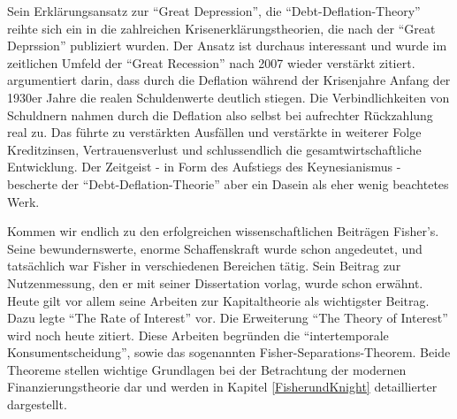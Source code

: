 Sein Erklärungsansatz zur "`Great Depression"', die "`Debt-Deflation-Theory"' \parencite{Fisher1933} reihte sich ein in die zahlreichen Krisenerklärungstheorien, die nach der "`Great Deprssion"' publiziert wurden. Der Ansatz ist durchaus interessant und wurde im zeitlichen Umfeld der "`Great Recession"' nach 2007 wieder verstärkt zitiert. \textcite{Fisher1933} argumentiert darin, dass durch die Deflation während der Krisenjahre Anfang der 1930er Jahre die realen  Schuldenwerte deutlich stiegen. Die Verbindlichkeiten von Schuldnern nahmen durch die Deflation also selbst bei aufrechter Rückzahlung real zu. Das führte zu verstärkten Ausfällen und verstärkte in weiterer Folge Kreditzinsen, Vertrauensverlust und schlussendlich die gesamtwirtschaftliche Entwicklung. Der Zeitgeist - in Form des Aufstiegs des Keynesianismus - bescherte der "`Debt-Deflation-Theorie"' aber ein Dasein als eher wenig beachtetes Werk.

Kommen wir endlich zu den erfolgreichen wissenschaftlichen Beiträgen Fisher's. Seine bewundernswerte, enorme Schaffenskraft wurde schon angedeutet, und tatsächlich war Fisher in verschiedenen Bereichen tätig. Sein Beitrag zur Nutzenmessung, den er mit seiner Dissertation \parencite{Fisher1892} vorlag, wurde schon erwähnt. Heute gilt vor allem seine Arbeiten zur Kapitaltheorie als wichtigster Beitrag. Dazu legte \textcite{Fisher1907} "`The Rate of Interest"' vor. Die Erweiterung \textcite{Fisher1930} "`The Theory of Interest"' wird noch heute zitiert. Diese Arbeiten begründen die "`intertemporale Konsumentscheidung"', sowie das sogenannten Fisher-Separations-Theorem. Beide Theoreme stellen wichtige Grundlagen bei der Betrachtung der modernen Finanzierungstheorie dar und werden in Kapitel \ref{FisherundKnight} detaillierter dargestellt.

